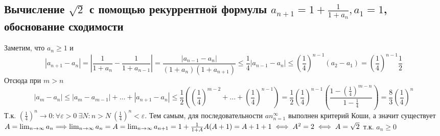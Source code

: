 \documentclass[12pt]{article}
\begin{document}
\subsection{Вычисление $\sqrt{2}$ с помощью рекуррентной формулы $a_{n+1} = 1 + \frac{1}{1+a_n}, a_1 = 1$, обоснование сходимости} Заметим, что $a_n \geqslant 1$ и $$|a_{n+1} - a_n| = \left|\frac{1}{1+a_n} - \frac{1}{1+a_{n-1}} \right| = \frac{|a_{n-1} - a_n|}{(1+a_n)(1+a_{n+1})} \leqslant \frac{1}{4}|a_{n-1} - a_n| \leqslant \left(\frac{1}{4}\right)^{n-1}(a_2 - a_1) = \left(\frac{1}{4}\right)^{n-1} \frac{1}{2}$$ Отсюда при $m > n$ $$|a_m - a_n| \leqslant |a_m - a_{m-1}| +...+ |a_{n+1} - a_n| \leqslant \frac{1}{2}\left(\left(\frac{1}{4}\right)^{m-2} + ... + \left(\frac{1}{4}\right)^{n-1}\right) = \frac{1}{2}\left(\frac{1}{4}\right)^{n-1}\left(\frac{1 - \left(\frac{1}{4}\right)^{m-n}}{1 - \frac{1}{4}}\right) = \frac{8}{3}\left(\frac{1}{4}\right)^n$$ Т.к. $\left(\frac{1}{4}\right)^n \rightarrow 0: \forall \varepsilon > 0 \ \exists N: n> N \ \left(\frac{1}{4}\right)^n < \varepsilon$. Тем самым, для последовательности ${an}_{n=1}^\infty$ выполнен критерий Коши, а значит существует $A = \lim_{n\to\infty} a_n \Longrightarrow \lim_{n\to\infty} a_n = A = \lim_{n\to\infty} a_{n+1} = 1 + \frac{1}{1 + A} \\ A(A+1) = A + 1 + 1 \iff A^2 = 2 \iff A = \sqrt{2}$ т.к. $a_n \geqslant 0$
\end{document}
